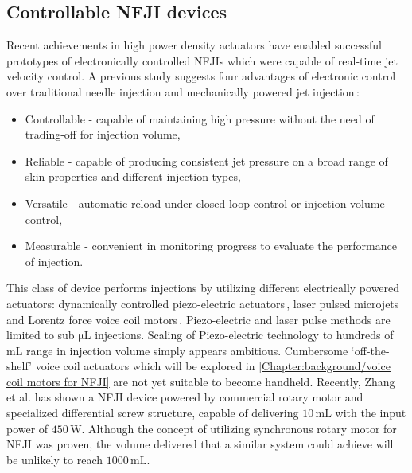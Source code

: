     \subsection{Controllable \acs{NFJI} devices}    \label{Chapter:background/needle-free jet injection/Controllable NFJI}
    
        Recent achievements in high power density actuators have enabled successful prototypes of electronically controlled \acsp{NFJI} which were capable of real-time jet velocity control. A previous study suggests four advantages of electronic control over traditional needle injection and mechanically powered jet injection\,\cite{henmond2013}:
        
        \begin{itemize}
            \item Controllable - capable of maintaining high pressure without the need of trading-off for injection volume,
            \item Reliable - capable of producing consistent jet pressure on a broad range of skin properties and different injection types,
            \item Versatile - automatic reload under closed loop control or injection volume control,
            \item Measurable - convenient in monitoring progress to evaluate the performance of injection.
        \end{itemize}
        
        This class of device performs injections by utilizing different electrically powered actuators: dynamically controlled piezo-electric actuators\,\cite{Stachowiak2009}, laser pulsed microjets\,\cite{tawaga2013, park2012} and Lorentz force voice coil motors\,\cite{taberner2006,hemond2006}. Piezo-electric and laser pulse methods are limited to sub $\mathrm{\mu L}$ injections. Scaling of Piezo-electric technology to hundreds of $\mathrm{mL}$ range in injection volume simply appears ambitious. Cumbersome ‘off-the-shelf’ voice coil actuators which will be explored in \ref{Chapter:background/voice coil motors for NFJI} are not yet suitable to become handheld. Recently, Zhang et al. has shown a \acs{NFJI} device powered by commercial rotary motor and specialized differential screw structure, capable of delivering $10\,\mathrm{mL}$ with the input power of $450\,\mathrm{W}$. Although the concept of utilizing synchronous rotary motor for \acs{NFJI} was proven, the volume delivered that a similar system could achieve will be unlikely to reach $1000\,\mathrm{mL}$.

